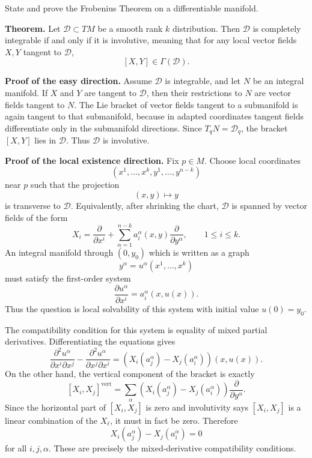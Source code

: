\begin{exercise}
\label{geometry:2016:9}
State and prove the Frobenius Theorem on a differentiable manifold.
\end{exercise}

\begin{solution}
\textbf{Theorem.}
Let $\mathcal D\subset TM$ be a smooth rank $k$ distribution. Then $\mathcal D$ is completely integrable if and only if it is involutive, meaning that for any local vector fields $X,Y$ tangent to $\mathcal D$,
\[
[X,Y]\in \Gamma(\mathcal D).
\]

\textbf{Proof of the easy direction.}
Assume $\mathcal D$ is integrable, and let $N$ be an integral manifold. If $X$ and $Y$ are tangent to $\mathcal D$, then their restrictions to $N$ are vector fields tangent to $N$. The Lie bracket of vector fields tangent to a submanifold is again tangent to that submanifold, because in adapted coordinates tangent fields differentiate only in the submanifold directions. Since $T_qN=\mathcal D_q$, the bracket $[X,Y]$ lies in $\mathcal D$. Thus $\mathcal D$ is involutive.

\textbf{Proof of the local existence direction.}
Fix $p\in M$. Choose local coordinates
\[
(x^1,\dots,x^k,y^1,\dots,y^{n-k})
\]
near $p$ such that the projection
\[
(x,y)\mapsto y
\]
is transverse to $\mathcal D$. Equivalently, after shrinking the chart, $\mathcal D$ is spanned by vector fields of the form
\[
X_i
=
\frac{\partial}{\partial x^i}
+
\sum_{\alpha=1}^{n-k} a_i^\alpha(x,y)\frac{\partial}{\partial y^\alpha},
\qquad 1\leq i\leq k.
\]
An integral manifold through $(0,y_0)$ which is written as a graph
\[
y^\alpha=u^\alpha(x^1,\dots,x^k)
\]
must satisfy the first-order system
\[
\frac{\partial u^\alpha}{\partial x^i}
=
a_i^\alpha(x,u(x)).
\]
Thus the question is local solvability of this system with initial value $u(0)=y_0$.

The compatibility condition for this system is equality of mixed partial derivatives. Differentiating the equations gives
\[
\frac{\partial^2u^\alpha}{\partial x^i\partial x^j}
-
\frac{\partial^2u^\alpha}{\partial x^j\partial x^i}
=
\left(
X_i(a_j^\alpha)-X_j(a_i^\alpha)
\right)(x,u(x)).
\]
On the other hand, the vertical component of the bracket is exactly
\[
[X_i,X_j]^{\mathrm{vert}}
=
\sum_{\alpha}
\left(
X_i(a_j^\alpha)-X_j(a_i^\alpha)
\right)
\frac{\partial}{\partial y^\alpha}.
\]
Since the horizontal part of $[X_i,X_j]$ is zero and involutivity says $[X_i,X_j]$ is a linear combination of the $X_\ell$, it must in fact be zero. Therefore
\[
X_i(a_j^\alpha)-X_j(a_i^\alpha)=0
\]
for all $i,j,\alpha$. These are precisely the mixed-derivative compatibility conditions.


\end{solution}

